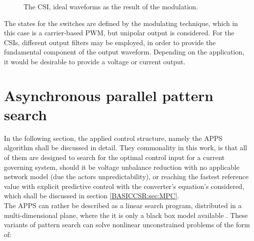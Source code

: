 {\begin{figure}[h!]
                \caption{The CSI, ideal waveforms as the result of the modulation.}
                \label{BASICCSR:fig:CSIwave_All}
            \end{figure}

The states for the switches are defined by the modulating technique, which in this case is a carrier-based PWM, but unipolar output is considered. For the CSIs, different output filters may be employed, in order to provide the fundamental component of the output waveform. Depending on the application, it would be desirable to provide a voltage or current output.

\section{Asynchronous parallel pattern search}\label{BASICUNB:sec:APPS}

In the following section, the applied control structure, namely the APPS algorithm shall be discussed in detail. %
They commonality in this work, is that all of them are designed to search for the optimal control input for a current governing system, should it be voltage unbalance reduction with no applicable network model (due the actors unpredictability), or reaching the fastest reference value with explicit predictive control with the converter's equation's considered, which shall be discussed in section \ref{BASICCSR:sec:MPC}.\\
The APPS can rather be described as a linear search program, distributed in a multi-dimensional plane, where the it is only a black box model available \cite{kolda2003understanding}. These variants of pattern search can solve nonlinear unconstrained problems of the form of:

}
